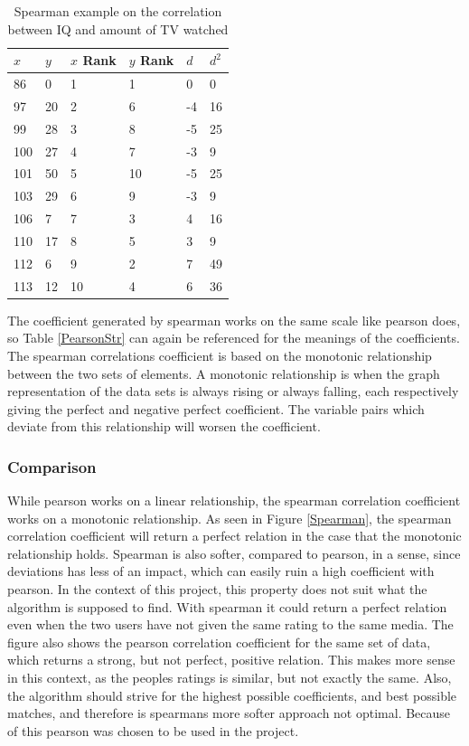 \begin{table}[htb]
\centering
\begin{tabular}{|l|l|l|l|l|l|} \hline
	\textbf{$x$} & \textbf{$y$} & \textbf{$x$ Rank} & \textbf{$y$ Rank} & \textbf{$d$} & \textbf{$d^2$} \\ \hline
	86 & 0 & 1 & 1 & 0 & 0 \\ \hline
	97 & 20 & 2 & 6 & -4 & 16 \\ \hline
	99 & 28 & 3 & 8 & -5 & 25 \\ \hline
	100 & 27 & 4 & 7 & -3 & 9 \\ \hline
	101 & 50 & 5 & 10 & -5 & 25 \\ \hline
	103 & 29 & 6 & 9 & -3 & 9 \\ \hline
	106 & 7 & 7 & 3 & 4 & 16 \\ \hline
	110 & 17 & 8 & 5 & 3 & 9 \\ \hline
	112 & 6 & 9 & 2 & 7 & 49 \\ \hline
	113 & 12 & 10 & 4 & 6 & 36 \\ \hline
\end{tabular}
\caption{Spearman example on the correlation between IQ and amount of TV watched}
\label{SpearmanEx}
\end{table}

The coefficient generated by spearman works on the same scale like pearson does, so Table \ref{PearsonStr} can again be referenced for the meanings of the coefficients. The spearman correlations coefficient is based on the monotonic relationship between the two sets of elements\cite{Spearman2}. A monotonic relationship is when the graph representation of the data sets is always rising or always falling, each respectively giving the perfect and negative perfect coefficient. The variable pairs which deviate from this relationship will worsen the coefficient.

\subsubsection{Comparison}

While pearson works on a linear relationship, the spearman correlation coefficient works on a monotonic relationship. As seen in Figure \ref{Spearman}, the spearman correlation coefficient will return a perfect relation in the case that the monotonic relationship holds. Spearman is also softer, compared to pearson, in a sense, since deviations has less of an impact, which can easily ruin a high coefficient with pearson. In the context of this project, this property does not suit what the algorithm is supposed to find. With spearman it could return a perfect relation even when the two users have not given the same rating to the same media. The figure also shows the pearson correlation coefficient for the same set of data, which returns a strong, but not perfect, positive relation. This makes more sense in this context, as the peoples ratings is similar, but not exactly the same. Also, the algorithm should strive for the highest possible coefficients, and best possible matches, and therefore is spearmans more softer approach not optimal. Because of this pearson was chosen to be used in the project.

